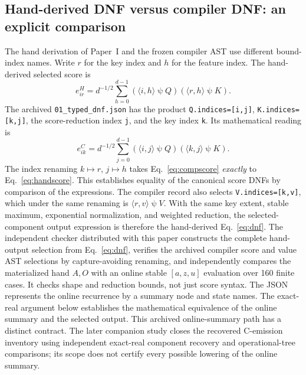 \documentclass[sigplan,10pt,review,balance=false,pbalance=false]{acmart}
\newcommand{\ps}{\mathbin{\psi}}
\begin{document}
\subsection{Hand-derived DNF versus compiler DNF: an explicit comparison}
The hand derivation of Paper~I and the frozen compiler AST use different bound-index names. Write $r$ for the key index and $h$ for the feature index. The hand-derived selected score is
\begin{equation}
 e_{ir}^{H}=d^{-1/2}\sum_{h=0}^{d-1}(\langle i,h\rangle\ps Q)(\langle r,h\rangle\ps K).
 \label{eq:handscore}
\end{equation}
The archived \texttt{01\_typed\_dnf.json} has the product \texttt{Q.indices=[i,j]}, \texttt{K.indices=[k,j]}, the score-reduction index \texttt{j}, and the key index \texttt{k}. Its mathematical reading is
\begin{equation}
 e_{ik}^{C}=d^{-1/2}\sum_{j=0}^{d-1}(\langle i,j\rangle\ps Q)(\langle k,j\rangle\ps K).
 \label{eq:compscore}
\end{equation}
The index renaming $k\mapsto r$, $j\mapsto h$ takes Eq.~\eqref{eq:compscore} \emph{exactly} to Eq.~\eqref{eq:handscore}. This establishes equality of the canonical score DNFs by comparison of the expressions. The compiler record also selects \texttt{V.indices=[k,v]}, which under the same renaming is $\langle r,v\rangle\ps V$. With the same key extent, stable maximum, exponential normalization, and weighted reduction, the selected-component output expression is therefore the hand-derived Eq.~\eqref{eq:dnf}. The independent checker distributed with this paper constructs the complete hand-output selection from Eq.~\eqref{eq:dnf}, verifies the archived compiler score and value AST selections by capture-avoiding renaming, and independently compares the materialized hand $A,O$ with an online stable $[a,z,u]$ evaluation over 160 finite cases. It checks shape and reduction bounds, not just score syntax. The JSON represents the online recurrence by a summary node and state names. The exact-real argument below establishes the mathematical equivalence of the online summary and the selected output. This archived online-summary path has a distinct contract. The later companion study closes the recovered C-emission inventory using independent exact-real component recovery and operational-tree comparisons; its scope does not certify every possible lowering of the online summary.
\end{document}

